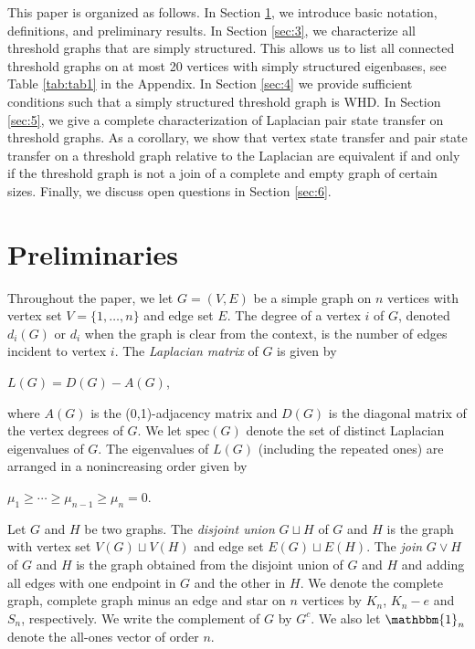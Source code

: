 \documentclass[preprint]{elsarticle}
\newcommand\spec{{\mathrm{spec}}}
\begin{document}
This paper is organized as follows. In Section \ref{sec:2}, we introduce basic notation, definitions, and preliminary results. In Section \ref{sec:3}, we characterize all threshold graphs that are simply structured. This allows us to list all connected threshold graphs on at most 20 vertices with simply structured eigenbases, see Table \ref{tab:tab1} in the Appendix. In Section \ref{sec:4} we provide sufficient conditions such that a simply structured threshold graph is WHD. In Section \ref{sec:5}, we give a complete characterization of Laplacian pair state transfer on threshold graphs. As a corollary, we show that vertex state transfer and pair state transfer on a threshold graph relative to the Laplacian are equivalent if and only if the threshold graph is not a join of a complete and empty graph of certain sizes. Finally, we discuss open questions in Section \ref{sec:6}.



\section{Preliminaries}\label{sec:2}

Throughout the paper, we let $G=(V,E)$ be a simple graph on $n$ vertices with vertex set $V=\{1, \ldots, n\}$ and edge set $E$. The degree of a vertex $i$ of $G$, denoted $d_{i}(G)$ or $d_{i}$ when the graph is clear from the context, is the number of edges incident to vertex $i$. The \textit{Laplacian matrix} of $G$ is given by
\begin{center}
$L(G) = D(G)-A(G)$,
\end{center}
where $A(G)$ is the (0,1)-adjacency matrix and $D(G)$ is the diagonal matrix of the vertex degrees of $G$. We let $\spec(G)$ denote the set of distinct Laplacian eigenvalues of $G$. The eigenvalues of $L(G)$ (including the repeated ones) are arranged in a nonincreasing order given by 
\begin{center}
$\mu_1 \geq  \cdots \geq \mu_{n-1} \geq \mu_{n} = 0.$
\end{center}
Let $G$ and $H$ be two graphs. The \textit{disjoint union} $G\sqcup H$ of $G$ and $H$ is the graph with vertex set $V(G)\sqcup V(H)$ and edge set $E(G)\sqcup E(H)$. The \textit{join} $G\vee H$ of $G$ and $H$ is the graph obtained from the disjoint union of $G$ and $H$ and adding all edges with one endpoint in $G$ and the other in $H$. We denote the complete graph, complete graph minus an edge and star on $n$ vertices by $K_n$, $K_n-e$ and $S_n$, respectively. We write the complement of $G$ by $G^c$. We also let $\mathbbm{1}_n$ denote the all-ones vector of order $n$. 
\end{document}
